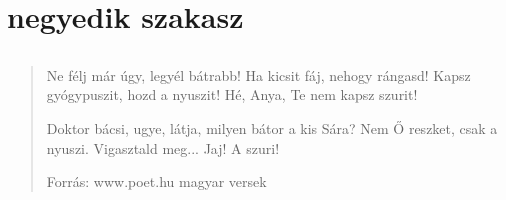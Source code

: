 \documentclass[twoside,12pt]{article}
\begin{document}
\section{negyedik szakasz}
\subsection{}
\subsection{}

\begin{quote}
\lipsum[1]
\end{quote}

\begin{quotation}
\lipsum[1]
\lipsum[2]
\end{quotation}

\begin{verse}
Ne félj már úgy, legyél bátrabb!
Ha kicsit fáj, nehogy rángasd!
Kapsz gyógypuszit, hozd a nyuszit!
Hé, Anya, Te nem kapsz szurit!

Doktor bácsi, ugye, látja,
milyen bátor a kis Sára?
Nem Ő reszket, csak a nyuszi.
Vigasztald meg... Jaj! A szuri!

Forrás: www.poet.hu magyar versek
\end{verse}
\end{document}

